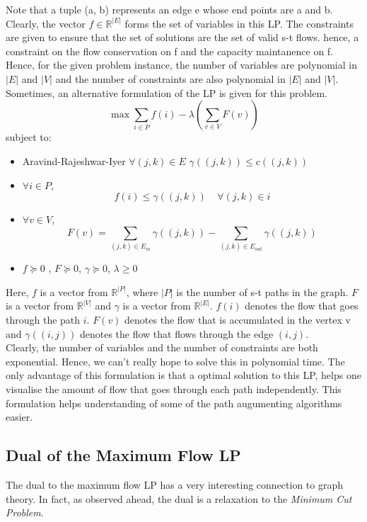 \documentclass[BTech]{iitmdiss}
\begin{document}
	  Note that a tuple (a, b) represents an edge e whose end points are a and b. \\
	  
	  Clearly, the vector $f \in \mathbb{R}^{|E|}$ forms the set of variables in this LP. The constraints are given to ensure that the set of 
	  solutions are the set of valid s-t flows. hence, a constraint on the flow conservation on f and the capacity maintanence on f. Hence, for the
	  given problem instance, the number of variables are polynomial in $|E|$ and $|V|$ and the number of constraints are also polynomial in $|E|$
	  and $|V|$. \\
	  
	  Sometimes, an alternative formulation of the LP is given for this problem. 
	  $$ \max \displaystyle\sum_{i \in P} f(i) - \lambda (\displaystyle\sum_{v \in V} F(v)) $$
	  subject to:
	  
	  \begin{itemize}
	   \item Aravind-Rajeshwar-Iyer
	      $\forall (j,k) \in E$  $\gamma((j,k)) \leq c((j,k))$
	   \item
	      $\forall i \in P$, 
		$$f(i) \leq \gamma((j,k))~~~~~\forall (j,k) \in i$$
	   \item
	      $\forall v \in V$,
	      $$F(v) = \displaystyle\sum_{(j,k) \in E_{in}} \gamma((j,k)) - \displaystyle\sum_{(j,k) \in E_{out}} \gamma((j,k))$$
	   \item
	      $f \succeq 0$ , $F \succeq 0$, $\gamma \succeq 0$, $\lambda \geq 0$
	  \end{itemize}
	  
	  Here, $f$ is a vector from $\mathbb{R}^{|P|}$, where $|P|$ is the number of s-t paths in the graph. $F$ is a vector from $\mathbb{R}^{|V|}$
	  and $\gamma$ is a vector from $\mathbb{R}^{|E|}$. $f(i)$ denotes the flow that goes through the path $i$. $F(v)$ denotes the flow that 
	  is accumulated in the vertex v and $\gamma((i,j))$ denotes the flow that flows through the edge $(i,j)$. \\
	  
	  Clearly, the number of variables and the number of constraints are both exponential. Hence, we can't really hope to solve this in polynomial
	  time. The only advantage of this formulation is that a optimal solution to this LP, helps one visualise the amount of flow that goes through
	  each path independently. This formulation helps understanding of some of the path augumenting algorithms easier.
	
	\subsection{Dual of the Maximum Flow LP}
	  The dual to the maximum flow LP has a very interesting connection to graph theory. In fact, as observed ahead, the dual is a relaxation 
	  to the \textit{Minimum Cut Problem}. \\
	  
\end{document}
